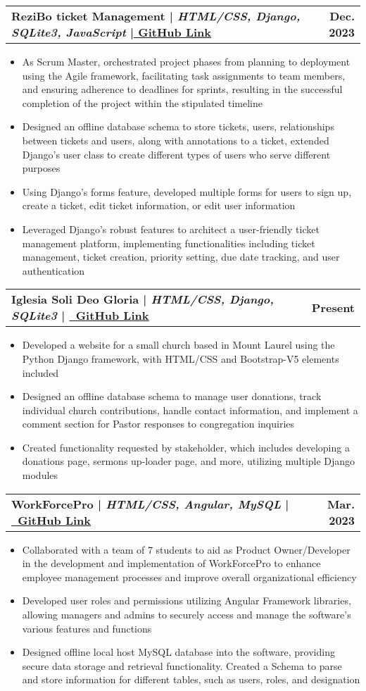 \documentclass[letterpaper,11pt]{article}
\makeatletter
\newcommand{\resumeItem}[1]{
  \item\small{
    {#1 \vspace{-3pt}}
  }
}
\newcommand{\resumeProjectHeading}[2]{
  \vspace{-3pt}\item
    \begin{tabular*}{1.0\textwidth}[t]{l@{\extracolsep{\fill}}r}
      \textbf{#1} & \textbf{\small #2} \\
    \end{tabular*}\vspace{-7pt}
}
\newcommand{\resumeItemListStart}{\begin{itemize}}
\newcommand{\resumeItemListEnd}{\end{itemize}\vspace{0pt}}
\makeatother
\begin{document}
        \resumeProjectHeading
        {ReziBo ticket Management | \textit{HTML/CSS, Django, SQLite3, JavaScript} \href{https://GitHub.com/david7franco/ReziBo}{\raisebox{-0.2\height}| \underline{GitHub Link}}}
        {Dec. 2023}
        \resumeItemListStart
            \resumeItem{As Scrum Master, orchestrated project phases from planning to deployment using the Agile framework, facilitating task assignments to team members, and ensuring adherence to deadlines for sprints, resulting in the successful completion of the project within the stipulated timeline }
            \resumeItem{Designed an offline database schema to store tickets, users, relationships between tickets and users, along with annotations to a ticket, extended Django's user class to create different types of users who serve different purposes }
            \resumeItem{Using Django's forms feature, developed multiple forms for users to sign up, create a ticket, edit ticket information, or edit user information} 
            \resumeItem{Leveraged Django's robust features to architect a user-friendly ticket management platform, implementing functionalities including ticket management, ticket creation, priority setting, due date tracking, and user authentication}
        \resumeItemListEnd
    
        \resumeProjectHeading
        {Iglesia Soli Deo Gloria | \textit{HTML/CSS, Django, SQLite3} | \href{https://GitHub.com/david7franco/IglesiaBautistaSoliDeoGloria}{\raisebox{-0.2\height} \ \underline{GitHub Link}}}
        {Present}
        \resumeItemListStart
            \resumeItem{Developed a website for a small church based in Mount Laurel using the Python Django framework, with HTML/CSS and Bootstrap-V5 elements included}
            \resumeItem{Designed an offline database schema to manage user donations, track individual church contributions, handle contact information, and implement a comment section for Pastor responses to congregation inquiries}
            \resumeItem{Created functionality requested by stakeholder, which includes developing a donations page, sermons up-loader page, and more, utilizing multiple Django modules}
        \resumeItemListEnd
        \resumeProjectHeading
        {WorkForcePro | \textit{HTML/CSS, Angular, MySQL} | \href{https://GitHub.com/awvolin/SWE}{\raisebox{-0.2\height}\ \underline{GitHub Link}}}
        {Mar. 2023}
        \resumeItemListStart
            \resumeItem {Collaborated with a team of 7 students to aid as Product Owner/Developer in the
development and implementation of WorkForcePro to enhance employee management processes and improve overall
organizational efficiency}
            \resumeItem {Developed user roles and permissions utilizing Angular Framework libraries, allowing
managers and admins to securely access and manage the software's various features and
functions}
            \resumeItem {Designed offline local host MySQL database into the software, providing secure data storage
and retrieval functionality. Created a Schema to parse and store information for different
tables, such as users, roles, and designation}
        \resumeItemListEnd
        
\end{document}
